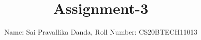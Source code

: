 \documentclass[journal,12pt,twocolumn]{IEEEtran}
\DeclareMathOperator*{\Res}{Res}
\begin{document}
\newcommand{\BEQA}{\begin{eqnarray}}
\newcommand{\EEQA}{\end{eqnarray}}
\newcommand{\define}{\stackrel{\triangle}{=}}

\raggedbottom
\setlength{\parindent}{0pt}
\providecommand{\mbf}{\mathbf}
\providecommand{\pr}[1]{\ensuremath{\Pr\left(#1\right)}}
\providecommand{\qfunc}[1]{\ensuremath{Q\left(#1\right)}}
\providecommand{\sbrak}[1]{\ensuremath{{}\left[#1\right]}}
\providecommand{\lsbrak}[1]{\ensuremath{{}\left[#1\right.}}
\providecommand{\rsbrak}[1]{\ensuremath{{}\left.#1\right]}}
\providecommand{\brak}[1]{\ensuremath{\left(#1\right)}}
\providecommand{\lbrak}[1]{\ensuremath{\left(#1\right.}}
\providecommand{\rbrak}[1]{\ensuremath{\left.#1\right)}}
\providecommand{\cbrak}[1]{\ensuremath{\left\{#1\right\}}}
\providecommand{\lcbrak}[1]{\ensuremath{\left\{#1\right.}}
\providecommand{\rcbrak}[1]{\ensuremath{\left.#1\right\}}}
\theoremstyle{remark}
\newtheorem{rem}{Remark}
\newcommand{\sgn}{\mathop{\mathrm{sgn}}}
\providecommand{\abs}[1]{\vert#1\vert}
\providecommand{\res}[1]{\Res\displaylimits_{#1}} 
\providecommand{\norm}[1]{\lVert#1\rVert}
\providecommand{\mtx}[1]{\mathbf{#1}}
\providecommand{\mean}[1]{E[ #1 ]}
\providecommand{\fourier}{\overset{\mathcal{F}}{ \rightleftharpoons}}
\providecommand{\system}{\overset{\mathcal{H}}{ \longleftrightarrow}}
\newcommand{\solution}{\noindent \textbf{Solution: }}
\newcommand{\cosec}{\,\text{cosec}\,}
\providecommand{\dec}[2]{\ensuremath{\overset{#1}{\underset{#2}{\gtrless}}}}
\newcommand{\myvec}[1]{\ensuremath{\begin{pmatrix}#1\end{pmatrix}}}
\newcommand{\mydet}[1]{\ensuremath{\begin{vmatrix}#1\end{vmatrix}}}
\makeatletter
{}
\makeatother
\let\StandardTheFigure\thefigure
\let\vec\mathbf
\renewcommand{\thefigure}{\theproblem}
\def\putbox#1#2#3{\makebox[0in][l]{\makebox[#1][l]{}\raisebox{\baselineskip}[0in][0in]{\raisebox{#2}[0in][0in]{#3}}}}
     \def\rightbox#1{\makebox[0in][r]{#1}}
     \def\centbox#1{\makebox[0in]{#1}}
     \def\topbox#1{\raisebox{-\baselineskip}[0in][0in]{#1}}
     \def\midbox#1{\raisebox{-0.5\baselineskip}[0in][0in]{#1}}
\vspace{3cm}
\title{Assignment-3}
\author{Name: Sai Pravallika Danda, Roll Number: CS20BTECH11013}
\end{document}
